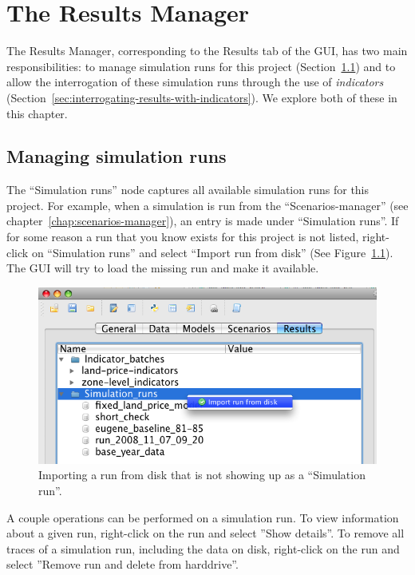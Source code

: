 
\chapter{The Results Manager}

The Results Manager, corresponding to the Results tab of the GUI, has
two main responsibilities: to manage simulation runs for this project
(Section~\ref{sec:managing-simulation-runs}) and to allow the
interrogation of these simulation runs through the use of
\emph{indicators}
(Section~\ref{sec:interrogating-results-with-indicators}). We explore
both of these in this chapter.

\section{Managing simulation runs}
\label{sec:managing-simulation-runs}

The ``Simulation runs'' node captures all
available simulation runs for this project. For example, when a
simulation is run from the ``Scenarios-manager'' (see
chapter~\ref{chap:scenarios-manager}), an entry is made under
``Simulation runs''. If for some reason a run that you know exists
for this project is not listed, right-click on 
``Simulation runs'' and select ``Import run from disk'' (See
Figure~\ref{fig:results-manager-import-run}). The GUI will try to load
the missing run and make it available.

\begin{figure}[htp]
\begin{center}
\includegraphics[width=.8\textwidth]{part-gui/images/result-manager-import-run-from-disk.png}
\end{center}
\caption{Importing a run from disk that is not showing up as a
``Simulation run''.}
\label{fig:results-manager-import-run}
\end{figure}

A couple operations can be performed on a simulation run. To view
information about a given run, right-click on the run and select
''Show details''. To remove all traces of a simulation run,
including the data on disk, right-click on the run and select
''Remove run and delete from harddrive''.

